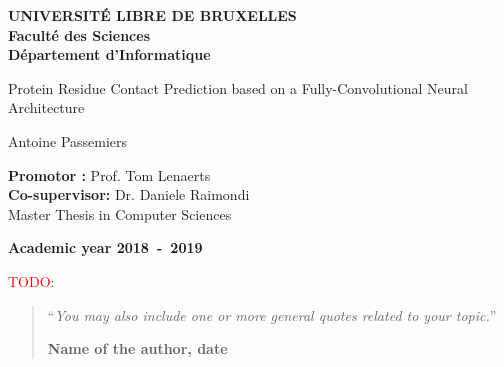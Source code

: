 \documentclass[11pt,a4paper,oneside]{book}
\newcommand{\todo}[1]{\textcolor{red}{TODO: #1}}
\begin{document}
\frontmatter
\begin{titlepage}
\begin{center}
\textbf{UNIVERSIT\'E LIBRE DE BRUXELLES}\\
\textbf{Facult\'{e} des Sciences}\\
\textbf{D\'{e}partement d'Informatique}
\vfill{}\vfill{}

{\huge Protein Residue Contact Prediction based \vspace*{.5cm} \linebreak[4]
on a Fully-Convolutional Neural Architecture}

{\Huge \par}
\begin{center}{\LARGE Antoine Passemiers}\end{center}{\Huge \par}
\vfill{}\vfill{}
\begin{flushright}{
    \large \textbf{Promotor :} Prof. Tom Lenaerts \\
    \textbf{Co-supervisor: } Dr. Daniele Raimondi} \\
    \vspace{0.5cm}
\hfill{}{\large Master Thesis in Computer Sciences}\\
{\large }\hfill{}{}\end{flushright}{\large\par}
\vfill{}\vfill{}\enlargethispage{3cm}
\textbf{Academic year 2018~-~2019}
\end{center}
\end{titlepage}
\newpage
\thispagestyle{empty} 
\null

\newenvironment{vcenterpage}
{\newpage\thispagestyle{empty} 
\vspace*{\fill}}
{\vspace*{\fill}\par\pagebreak}



\thispagestyle{empty}
\vspace*{5cm}

\todo{}

\begin{quotation}
  \noindent ``\emph{You may also include one or more general quotes related to your topic.}''
  \begin{flushright}\textbf{Name of the author, date}\end{flushright}
\end{quotation}
\end{document}
